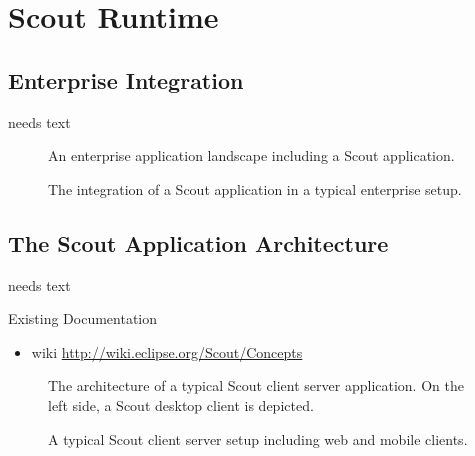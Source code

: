 \documentclass[a4paper,10pt,twoside]{book}
\begin{document}
  \sloppy
\fi


\chapter{Scout Runtime}

\section{Enterprise Integration}
needs text

\begin{figure}
\caption{An enterprise application landscape including a Scout application.}
\end{figure}

\begin{figure}
\caption{The integration of a Scout application in a typical enterprise setup.}
\end{figure}

\section{The Scout Application Architecture}
needs text

\noindent Existing Documentation
\begin{itemize}
  \item wiki \url{http://wiki.eclipse.org/Scout/Concepts}
\end{itemize}


\begin{figure}
\caption{The architecture of a typical Scout client server application.
On the left side, a Scout desktop client is depicted.}
\end{figure}

\begin{figure}
\caption{A typical Scout client server setup including web and mobile clients.}
\end{figure}
\end{document}
